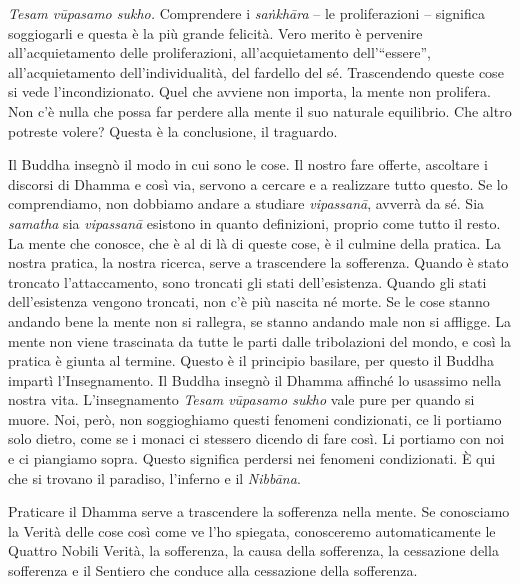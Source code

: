 \emph{Tesam vūpasamo sukho.} Comprendere i \emph{saṅkhāra} -- le
proliferazioni -- significa soggiogarli e questa è la più grande
felicità. Vero merito è pervenire all'acquietamento delle
proliferazioni, all'acquietamento dell'``essere'', all'acquietamento
dell'individualità, del fardello del sé. Trascendendo queste cose si
vede l'incondizionato. Quel che avviene non importa, la mente non
prolifera. Non c'è nulla che possa far perdere alla mente il suo
naturale equilibrio. Che altro potreste volere? Questa è la conclusione,
il traguardo.

Il Buddha insegnò il modo in cui sono le cose. Il nostro fare offerte,
ascoltare i discorsi di Dhamma e così via, servono a cercare e a
realizzare tutto questo. Se lo comprendiamo, non dobbiamo andare a
studiare \emph{vipassanā}, avverrà da sé. Sia \emph{samatha} sia
\emph{vipassanā} esistono in quanto definizioni, proprio come tutto il
resto. La mente che conosce, che è al di là di queste cose, è il culmine
della pratica. La nostra pratica, la nostra ricerca, serve a trascendere
la sofferenza. Quando è stato troncato l'attaccamento, sono troncati gli
stati dell'esistenza. Quando gli stati dell'esistenza vengono troncati,
non c'è più nascita né morte. Se le cose stanno andando bene la mente
non si rallegra, se stanno andando male non si affligge. La mente non
viene trascinata da tutte le parti dalle tribolazioni del mondo, e così
la pratica è giunta al termine. Questo è il principio basilare, per
questo il Buddha impartì l'Insegnamento. Il Buddha insegnò il Dhamma
affinché lo usassimo nella nostra vita. L'insegnamento \emph{Tesam
vūpasamo sukho} vale pure per quando si muore. Noi, però, non
soggioghiamo questi fenomeni condizionati, ce li portiamo solo dietro,
come se i monaci ci stessero dicendo di fare così. Li portiamo con noi e
ci piangiamo sopra. Questo significa perdersi nei fenomeni condizionati.
È qui che si trovano il paradiso, l'inferno e il \emph{Nibbāna}.

Praticare il Dhamma serve a trascendere la sofferenza nella mente. Se
conosciamo la Verità delle cose così come ve l'ho spiegata, conosceremo
automaticamente le Quattro Nobili Verità, la sofferenza, la causa della
sofferenza, la cessazione della sofferenza e il Sentiero che conduce
alla cessazione della sofferenza.

